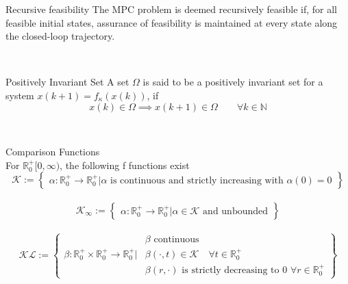 \begin{definition}{Recursive feasibility}
	The MPC problem is deemed recursively feasible if, for all feasible initial states, assurance of feasibility is maintained at every state along the closed-loop trajectory.
\end{definition}\\

\begin{definition}{Positively Invariant Set}
	A set $\Omega$ is said to be a positively invariant set for a system $x(k+1) = f_\kappa (x(k))$, if
	\begin{equation*}
		x(k)\in \Omega \implies x(k+1) \in \Omega \quad \quad \forall k \in \mathbb{N}
	\end{equation*}
\end{definition}\\



\begin{definition}{Comparison Functions}\\
	For $\mathbb{R}_0^+ [0,\infty)$, the following f functions exist
	\begin{equation}
		\mathcal{K} := \left\{
		\begin{aligned}
			\alpha : \mathbb{R}_0^+ \rightarrow \mathbb{R}_0^+\Bigg|\alpha \text{ is continuous}\text{ and strictly increasing with }\alpha(0) = 0
		\end{aligned}
		\right\}
	\end{equation}\\
	\begin{equation}
		\mathcal{K}_\infty := \left\{
		\begin{aligned}
			\alpha : \mathbb{R}_0^+ \rightarrow \mathbb{R}_0^+\Bigg|\alpha \in \mathcal{K} \text{ and unbounded}
		\end{aligned}
		\right\}
	\end{equation}\\
	\begin{equation}
		\mathcal{K}\mathcal{L}:= \left\{
		\begin{aligned}
			&\beta \text{ continuous}\\
			\beta : \mathbb{R}_0^+\times\mathbb{R}_0^+ \rightarrow \mathbb{R}_0^+\Bigg|&\beta(\cdot, t) \in \mathcal{K} \quad \forall t \in \mathbb{R}_0^+\\
			&\beta(r,\cdot) \text{ is strictly decreasing to 0 }\forall r\in \mathbb{R}_0^+ 
		\end{aligned}
		\right\}
	\end{equation}\\
\end{definition}

